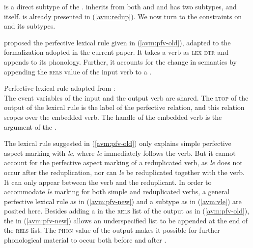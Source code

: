  is a direct subtype of the .
 inherits from both  and 
and has two subtypes,  and  itself.
 is already presented in (\ref{avm:redup}). 
We now turn to the constraints on  and its subtypes.


\citet[246]{MuellerLipenkova2013} proposed the perfective lexical rule given in (\ref{avm:pfv-old}), 
adapted to the formalization adopted in the current paper.
It takes a verb as \textsc{lex-dtr}
and appends  to its phonology.
Further, it accounts for the change in semantics by appending the \textsc{rels} value of the input verb to a .

\ea\label{avm:pfv-old}
Perfective lexical rule adapted from \citet[246]{MuellerLipenkova2013}:\\
\z
The event variables  of the input and the output verb are shared. 
The \textsc{ltop} of the output of the lexical rule  is the label of the perfective relation, 
and this relation scopes over the embedded verb. 
The handle of the embedded verb  is the argument of the . 

The lexical rule suggested in (\ref{avm:pfv-old}) only explains simple perfective aspect marking with \textit{le}, 
where \textit{le} immediately follows the verb.
But it cannot account for the perfective aspect marking of a reduplicated verb,
 as \textit{le} does not occur after the reduplication, 
nor can \textit{le} be reduplicated together with the verb.
It can only appear between the verb and the reduplicant.
In order to accommodate \textit{le} marking for both simple and reduplicated verbs, 
a general perfective lexical rule as in (\ref{avm:pfv-new}) and 
a subtype  as in (\ref{avm:vle}) are posited here.
Besides adding a  in the \textsc{rels} list of the output as in (\ref{avm:pfv-old}), 
the  in (\ref{avm:pfv-new}) allows an underspecified list to be appended at the end of the \textsc{rels} list.
The \textsc{phon} value of the output makes it possible for further phonological material to occur both before and after .

